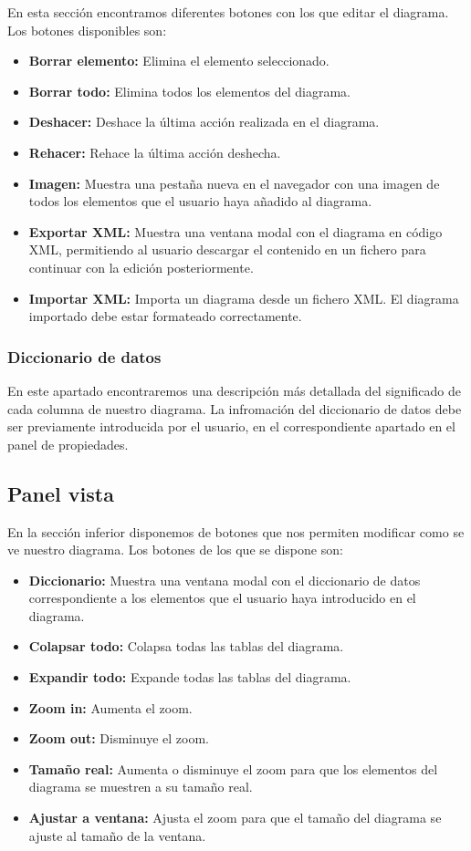 En esta sección encontramos diferentes botones con los que editar el diagrama. Los botones disponibles son:
\begin{itemize}
    \item \textbf{Borrar elemento: }Elimina el elemento seleccionado.
    \item \textbf{Borrar todo: }Elimina todos los elementos del diagrama.
    \item \textbf{Deshacer: }Deshace la última acción realizada en el diagrama.
    \item \textbf{Rehacer: }Rehace la última acción deshecha.
    \item \textbf{Imagen: }Muestra una pestaña nueva en el navegador con una imagen de todos los elementos que el usuario haya añadido al diagrama.
    \item \textbf{Exportar XML: }Muestra una ventana modal con el diagrama en código XML, permitiendo al usuario descargar el contenido en un fichero para continuar con la edición posteriormente.
    \item \textbf{Importar XML: }Importa un diagrama desde un fichero XML. El diagrama importado debe estar formateado correctamente.
\end{itemize}

\subsubsection{Diccionario de datos}
En este apartado encontraremos una descripción más detallada del significado de cada columna de nuestro diagrama. La infromación del diccionario de datos debe ser previamente introducida por el usuario, en el correspondiente apartado en el panel de propiedades.

\subsection{Panel vista}


En la sección inferior disponemos de botones que nos permiten modificar como se ve nuestro diagrama. Los botones de los que se dispone son:
\begin{itemize}
    \item \textbf{Diccionario: }Muestra una ventana modal con el diccionario de datos correspondiente a los elementos que el usuario haya introducido en el diagrama.
    \item \textbf{Colapsar todo: }Colapsa todas las tablas del diagrama.
    \item \textbf{Expandir todo: }Expande todas las tablas del diagrama.
    \item \textbf{Zoom in: }Aumenta el zoom.
    \item \textbf{Zoom out: }Disminuye el zoom.
    \item \textbf{Tamaño real: }Aumenta o disminuye el zoom para que los elementos del diagrama se muestren a su tamaño real.
    \item \textbf{Ajustar a ventana: }Ajusta el zoom para que el tamaño del diagrama se ajuste al tamaño de la ventana.
\end{itemize}


